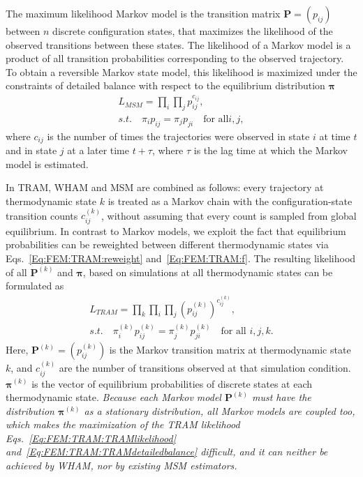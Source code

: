 The maximum likelihood Markov model is the transition matrix $\mathbf{P}=(p_{ij})$ between $n$ discrete configuration states, that maximizes the likelihood of the observed transitions between these states. The likelihood of a Markov model is a product of all transition probabilities corresponding to the observed trajectory. To obtain a reversible Markov state model, this likelihood is maximized under the constraints of detailed balance with respect to the equilibrium distribution $\boldsymbol{\pi}$
\begin{align}
    L_{MSM}=\prod_i\prod_j p_{ij}^{c_{ij}},\\
    s.t.\quad \pi_i p_{ij}=\pi_j p_{ji} \quad \text{for all} i,j,
\end{align}
where $c_{ij}$ is the number of times the trajectories were observed in state $i$ at time $t$ and in state $j$ at a later time $t+\tau$, where $\tau$ is the lag time at which the Markov model is estimated.

In TRAM, WHAM and MSM are combined as follows: every trajectory at thermodynamic state $k$ is treated as a Markov chain with the configuration-state transition counts $c_{ij}^{(k)}$, without assuming that every count is sampled from global equilibrium. In contrast to Markov models, we exploit the fact that equilibrium probabilities can be reweighted between different thermodynamic states via Eqs.~\ref{Eq:FEM:TRAM:reweight} and~\ref{Eq:FEM:TRAM:f}. The resulting likelihood of all $\mathbf{P}^{(k)}$ and $\boldsymbol{\pi}$, based on simulations at all thermodynamic states can be formulated as
\begin{align}
	L_{TRAM}=\prod_k\prod_i\prod_j (p_{ij}^{(k)})^{c_{ij}^{(k)}},\label{Eq:FEM:TRAM:TRAMlikelihood}\\
	s.t.\quad \pi_i^{(k)}p_{ij}^{(k)}=\pi_j^{(k)}p_{ji}^{(k)}\quad \text{for all }i,j,k. \label{Eq:FEM:TRAM:TRAMdetailedbalance}
\end{align}
Here, $\mathbf{P}^{(k)}=(p_{ij}^{(k)})$ is the Markov transition matrix at thermodynamic state $k$, and $c_{ij}^{(k)}$ are the number of transitions observed at that simulation condition. $\boldsymbol{\pi}^{(k)}$ is the vector of equilibrium probabilities of discrete states at each thermodynamic state. \emph{Because each Markov model $\mathbf{P}^{(k)}$ must have the distribution $\boldsymbol{\pi}^{(k)}$ as a stationary distribution, all Markov models are coupled too, which makes the maximization of the TRAM likelihood Eqs.~\ref{Eq:FEM:TRAM:TRAMlikelihood} and~\ref{Eq:FEM:TRAM:TRAMdetailedbalance} difficult, and it can neither be achieved by WHAM, nor by existing MSM estimators.}

